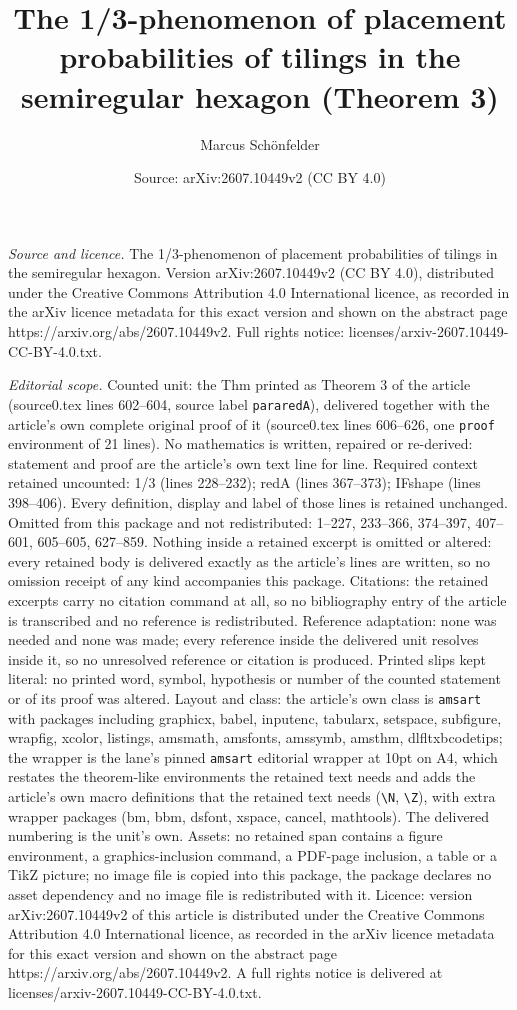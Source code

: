 \documentclass[10pt,a4paper]{amsart}
\title[The 1/3-phenomenon of placement probabilities of tilings in ]{The 1/3-phenomenon of placement probabilities of tilings in the semiregular hexagon (Theorem 3)}
\author{Marcus Sch\"onfelder}
\date{Source: arXiv:2607.10449v2 (CC BY 4.0)}
\begin{document}
\maketitle

\noindent\emph{Source and licence.} The 1/3-phenomenon of placement probabilities of tilings in the semiregular hexagon. Version arXiv:2607.10449v2 (CC BY 4.0), distributed under the Creative Commons Attribution 4.0 International licence, as recorded in the arXiv licence metadata for this exact version and shown on the abstract page https://arxiv.org/abs/2607.10449v2. Full rights notice: licenses/arxiv-2607.10449-CC-BY-4.0.txt.\par\smallskip

\noindent\textit{Editorial scope.} Counted unit: the Thm printed as Theorem 3 of the article (source0.tex lines 602--604, source label \texttt{pararedA}), delivered together with the article's own complete original proof of it (source0.tex lines 606--626, one \texttt{proof} environment of 21 lines). No mathematics is written, repaired or re-derived: statement and proof are the article's own text line for line. Required context retained uncounted: 1/3 (lines 228--232); redA (lines 367--373); IFshape (lines 398--406). Every definition, display and label of those lines is retained unchanged. Omitted from this package and not redistributed: 1--227, 233--366, 374--397, 407--601, 605--605, 627--859. Nothing inside a retained excerpt is omitted or altered: every retained body is delivered exactly as the article's lines are written, so no omission receipt of any kind accompanies this package. Citations: the retained excerpts carry no citation command at all, so no bibliography entry of the article is transcribed and no reference is redistributed. Reference adaptation: none was needed and none was made; every reference inside the delivered unit resolves inside it, so no unresolved reference or citation is produced. Printed slips kept literal: no printed word, symbol, hypothesis or number of the counted statement or of its proof was altered. Layout and class: the article's own class is \texttt{amsart} with packages including graphicx, babel, inputenc, tabularx, setspace, subfigure, wrapfig, xcolor, listings, amsmath, amsfonts, amssymb, amsthm, dlfltxbcodetips; the wrapper is the lane's pinned \texttt{amsart} editorial wrapper at 10pt on A4, which restates the theorem-like environments the retained text needs and adds the article's own macro definitions that the retained text needs (\texttt{\textbackslash N}, \texttt{\textbackslash Z}), with extra wrapper packages (bm, bbm, dsfont, xspace, cancel, mathtools). The delivered numbering is the unit's own. Assets: no retained span contains a figure environment, a graphics-inclusion command, a PDF-page inclusion, a table or a TikZ picture; no image file is copied into this package, the package declares no asset dependency and no image file is redistributed with it. Licence: version arXiv:2607.10449v2 of this article is distributed under the Creative Commons Attribution 4.0 International licence, as recorded in the arXiv licence metadata for this exact version and shown on the abstract page https://arxiv.org/abs/2607.10449v2. A full rights notice is delivered at licenses/arxiv-2607.10449-CC-BY-4.0.txt. 
\end{document}
